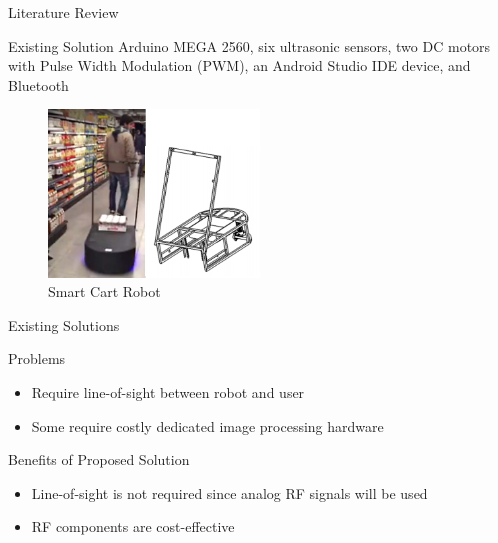 \documentclass{beamer}
\begin{document}

\begin{frame}{Literature Review}
  \begin{block}{Existing Solution}
    Arduino MEGA 2560, six ultrasonic sensors, two DC motors with Pulse Width Modulation (PWM), an Android Studio IDE device, and Bluetooth~\cite{Rawashdeh2017-Person}
  \end{block}
    \begin{figure}[b]
        \centering
        \includegraphics[width=0.50\textwidth]{figs/img/SmartCart}
        \caption{Smart Cart Robot}
    \end{figure}
\end{frame}


\begin{frame}{Existing Solutions}
  \begin{block}{Problems}
    \begin{itemize}
      \item Require line-of-sight between robot and user
      \item Some require costly dedicated image processing hardware
    \end{itemize}
  \end{block}
  \pause
  \begin{block}{Benefits of Proposed Solution}
    \begin{itemize}
      \item Line-of-sight is not required since analog RF signals will be used
      \item RF components are cost-effective
    \end{itemize}
  \end{block}
\end{frame}

\end{document}
